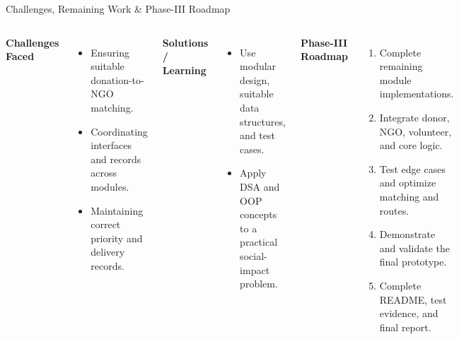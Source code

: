 \documentclass[aspectratio=169,11pt]{beamer}
\begin{document}
\begin{frame}{Challenges, Remaining Work \& Phase-III Roadmap}
\small
\begin{columns}[T,totalwidth=\textwidth]
\textbf{\color{GEUBlue}Challenges Faced}
\begin{itemize}\itemsep1pt\parskip0pt
\item Ensuring suitable donation-to-NGO matching.
\item Coordinating interfaces and records across modules.
\item Maintaining correct priority and delivery records.
\end{itemize}
\vspace{1mm}
\textbf{\color{GEUBlue}Solutions / Learning}
\begin{itemize}\itemsep1pt\parskip0pt
\item Use modular design, suitable data structures, and test cases.
\item Apply DSA and OOP concepts to a practical social-impact problem.
\end{itemize}
\textbf{\color{GEUBlue}Phase-III Roadmap}
\begin{enumerate}\itemsep2pt\parskip0pt
\item Complete remaining module implementations.
\item Integrate donor, NGO, volunteer, and core logic.
\item Test edge cases and optimize matching and routes.
\item Demonstrate and validate the final prototype.
\item Complete README, test evidence, and final report.
\end{enumerate}
\end{columns}
\end{frame}
\end{document}
